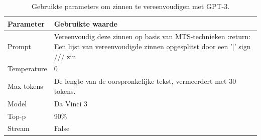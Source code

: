 \begin{center}
	\begin{table}[H]
		\begin{tabular}{| m{5cm}| m{8cm} |}
			\hline
			Parameter & Gebruikte waarde \\ \hline
			Prompt & Vereenvoudig deze zinnen op basis van {MTS-technieken} :return: Een lijst van vereenvoudigde zinnen opgesplitst door een '|' sign /// {zin} \\ \hline
			Temperature & 0 \\ \hline
			Max tokens & De lengte van de oorspronkelijke tekst, vermeerdert met 30 tokens. \\ \hline
			Model & Da Vinci 3 \\ \hline
			Top-p & 90\% \\ \hline
			Stream & False \\ \hline
		\end{tabular}
		\caption{Gebruikte parameters om zinnen te vereenvoudigen met GPT-3.}
		\label{table:gpt-3-sentence-simplification}
	\end{table}
\end{center}

\medspace

